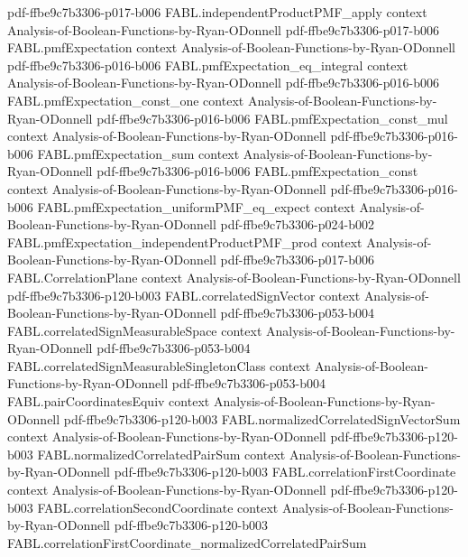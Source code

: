 \begin{theorem}
  {pdf-ffbe9c7b3306-p017-b006}
\proofstep
  {FABL.independentProductPMF_apply}
  {context}
  {Analysis-of-Boolean-Functions-by-Ryan-ODonnell}
  {pdf-ffbe9c7b3306-p017-b006}
\proofstep
  {FABL.pmfExpectation}
  {context}
  {Analysis-of-Boolean-Functions-by-Ryan-ODonnell}
  {pdf-ffbe9c7b3306-p016-b006}
\proofstep
  {FABL.pmfExpectation_eq_integral}
  {context}
  {Analysis-of-Boolean-Functions-by-Ryan-ODonnell}
  {pdf-ffbe9c7b3306-p016-b006}
\proofstep
  {FABL.pmfExpectation_const_one}
  {context}
  {Analysis-of-Boolean-Functions-by-Ryan-ODonnell}
  {pdf-ffbe9c7b3306-p016-b006}
\proofstep
  {FABL.pmfExpectation_const_mul}
  {context}
  {Analysis-of-Boolean-Functions-by-Ryan-ODonnell}
  {pdf-ffbe9c7b3306-p016-b006}
\proofstep
  {FABL.pmfExpectation_sum}
  {context}
  {Analysis-of-Boolean-Functions-by-Ryan-ODonnell}
  {pdf-ffbe9c7b3306-p016-b006}
\proofstep
  {FABL.pmfExpectation_const}
  {context}
  {Analysis-of-Boolean-Functions-by-Ryan-ODonnell}
  {pdf-ffbe9c7b3306-p016-b006}
\proofstep
  {FABL.pmfExpectation_uniformPMF_eq_expect}
  {context}
  {Analysis-of-Boolean-Functions-by-Ryan-ODonnell}
  {pdf-ffbe9c7b3306-p024-b002}
\proofstep
  {FABL.pmfExpectation_independentProductPMF_prod}
  {context}
  {Analysis-of-Boolean-Functions-by-Ryan-ODonnell}
  {pdf-ffbe9c7b3306-p017-b006}
\proofstep
  {FABL.CorrelationPlane}
  {context}
  {Analysis-of-Boolean-Functions-by-Ryan-ODonnell}
  {pdf-ffbe9c7b3306-p120-b003}
\proofstep
  {FABL.correlatedSignVector}
  {context}
  {Analysis-of-Boolean-Functions-by-Ryan-ODonnell}
  {pdf-ffbe9c7b3306-p053-b004}
\proofstep
  {FABL.correlatedSignMeasurableSpace}
  {context}
  {Analysis-of-Boolean-Functions-by-Ryan-ODonnell}
  {pdf-ffbe9c7b3306-p053-b004}
\proofstep
  {FABL.correlatedSignMeasurableSingletonClass}
  {context}
  {Analysis-of-Boolean-Functions-by-Ryan-ODonnell}
  {pdf-ffbe9c7b3306-p053-b004}
\proofstep
  {FABL.pairCoordinatesEquiv}
  {context}
  {Analysis-of-Boolean-Functions-by-Ryan-ODonnell}
  {pdf-ffbe9c7b3306-p120-b003}
\proofstep
  {FABL.normalizedCorrelatedSignVectorSum}
  {context}
  {Analysis-of-Boolean-Functions-by-Ryan-ODonnell}
  {pdf-ffbe9c7b3306-p120-b003}
\proofstep
  {FABL.normalizedCorrelatedPairSum}
  {context}
  {Analysis-of-Boolean-Functions-by-Ryan-ODonnell}
  {pdf-ffbe9c7b3306-p120-b003}
\proofstep
  {FABL.correlationFirstCoordinate}
  {context}
  {Analysis-of-Boolean-Functions-by-Ryan-ODonnell}
  {pdf-ffbe9c7b3306-p120-b003}
\proofstep
  {FABL.correlationSecondCoordinate}
  {context}
  {Analysis-of-Boolean-Functions-by-Ryan-ODonnell}
  {pdf-ffbe9c7b3306-p120-b003}
\proofstep
  {FABL.correlationFirstCoordinate_normalizedCorrelatedPairSum}

\end{theorem}
